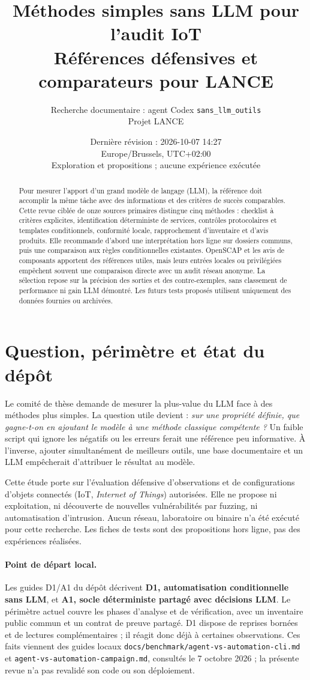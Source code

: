 \documentclass[11pt,a4paper]{article}
\title{Méthodes simples sans LLM pour l'audit IoT\\\large Références défensives et comparateurs pour LANCE}
\author{Recherche documentaire : agent Codex \texttt{sans\_llm\_outils}\\Projet LANCE}
\date{Dernière révision : 2026-10-07 14:27\\Europe/Brussels, UTC+02:00\\\small Exploration et propositions ; aucune expérience exécutée}
\begin{document}
\maketitle
\begin{abstract}
Pour mesurer l'apport d'un grand modèle de langage (LLM), la référence doit accomplir la même tâche avec des informations et des critères de succès comparables. Cette revue ciblée de onze sources primaires distingue cinq méthodes : checklist à critères explicites, identification déterministe de services, contrôles protocolaires et templates conditionnels, conformité locale, rapprochement d'inventaire et d'avis produits. Elle recommande d'abord une interprétation hors ligne sur dossiers communs, puis une comparaison aux règles conditionnelles existantes. OpenSCAP et les avis de composants apportent des références utiles, mais leurs entrées locales ou privilégiées empêchent souvent une comparaison directe avec un audit réseau anonyme. La sélection repose sur la précision des sorties et des contre-exemples, sans classement de performance ni gain LLM démontré. Les futurs tests proposés utilisent uniquement des données fournies ou archivées.
\end{abstract}
\tableofcontents

\section{Question, périmètre et état du dépôt}
Le comité de thèse demande de mesurer la plus-value du LLM face à des méthodes plus simples. La question utile devient : \emph{sur une propriété définie, que gagne-t-on en ajoutant le modèle à une méthode classique compétente ?} Un faible script qui ignore les négatifs ou les erreurs ferait une référence peu informative. À l'inverse, ajouter simultanément de meilleurs outils, une base documentaire et un LLM empêcherait d'attribuer le résultat au modèle.

Cette étude porte sur l'évaluation défensive d'observations et de configurations d'objets connectés (IoT, \emph{Internet of Things}) autorisées. Elle ne propose ni exploitation, ni découverte de nouvelles vulnérabilités par fuzzing, ni automatisation d'intrusion. Aucun réseau, laboratoire ou binaire n'a été exécuté pour cette recherche. Les fiches de tests sont des propositions hors ligne, pas des expériences réalisées.

\paragraph{Point de départ local.}
Les guides D1/A1 du dépôt décrivent \textbf{D1, automatisation conditionnelle sans LLM}, et \textbf{A1, socle déterministe partagé avec décisions LLM}. Le périmètre actuel couvre les phases d'analyse et de vérification, avec un inventaire public commun et un contrat de preuve partagé. D1 dispose de reprises bornées et de lectures complémentaires ; il réagit donc déjà à certaines observations. Ces faits viennent des guides locaux \texttt{docs/benchmark/agent-vs-automation-cli.md} et \texttt{agent-vs-automation-campaign.md}, consultés le 7 octobre 2026 ; la présente revue n'a pas revalidé son code ou son déploiement.
\end{document}
